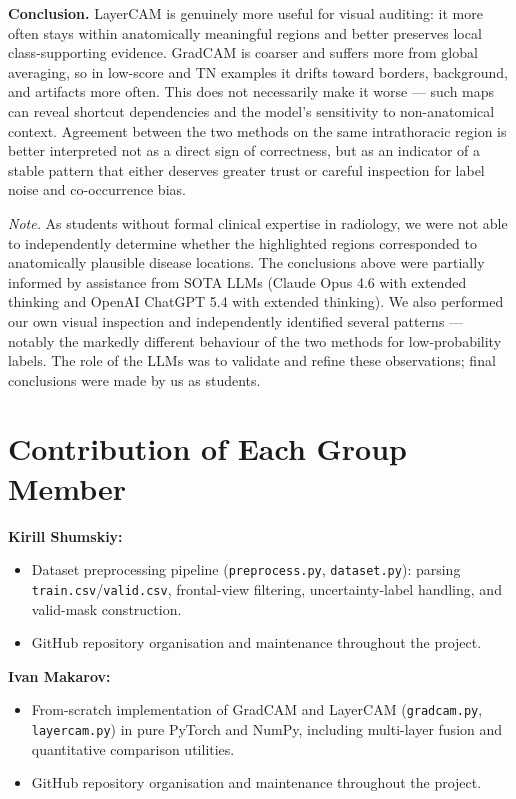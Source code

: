 \documentclass[12pt]{article}
\begin{document}
\smallskip
\textbf{Conclusion.}
LayerCAM is genuinely more useful for visual auditing: it more often stays within anatomically meaningful regions and better preserves local class-supporting evidence.
GradCAM is coarser and suffers more from global averaging, so in low-score and TN examples it drifts toward borders, background, and artifacts more often.
This does not necessarily make it worse --- such maps can reveal shortcut dependencies and the model's sensitivity to non-anatomical context.
Agreement between the two methods on the same intrathoracic region is better interpreted not as a direct sign of correctness, but as an indicator of a stable pattern that either deserves greater trust or careful inspection for label noise and co-occurrence bias.

\smallskip
\textit{Note.}
As students without formal clinical expertise in radiology, we were not able to independently determine whether the highlighted regions corresponded to anatomically plausible disease locations. 
The conclusions above were partially informed by assistance from SOTA LLMs (Claude Opus 4.6 with extended thinking and OpenAI ChatGPT 5.4 with extended thinking). We also performed our own visual inspection and independently identified several patterns — notably the markedly different behaviour of the two methods for low-probability labels. 
The role of the LLMs was to validate and refine these observations; final conclusions were made by us as students.

\section{Contribution of Each Group Member}

\textbf{Kirill Shumskiy:}
\begin{itemize}[leftmargin=*]
    \item Dataset preprocessing pipeline (\texttt{preprocess.py}, \texttt{dataset.py}): parsing \texttt{train.csv}/\texttt{valid.csv}, frontal-view filtering, uncertainty-label handling, and valid-mask construction.
    \item GitHub repository organisation and maintenance throughout the project.
\end{itemize}

\textbf{Ivan Makarov:}
\begin{itemize}[leftmargin=*]
    \item From-scratch implementation of GradCAM and LayerCAM (\texttt{gradcam.py}, \texttt{layercam.py}) in pure PyTorch and NumPy, including multi-layer fusion and quantitative comparison utilities.
    \item GitHub repository organisation and maintenance throughout the project.
\end{itemize}
\end{document}

